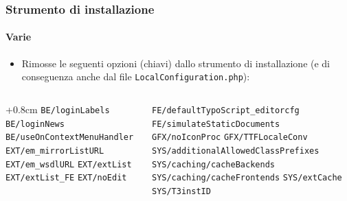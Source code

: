 
\begin{frame}[fragile]
	\frametitle{Strumento di installazione}
	\framesubtitle{Varie}

	\begin{itemize}
		\item Rimosse le seguenti opzioni (chiavi) dallo strumento di installazione\newline
			(e di conseguenza anche dal file \texttt{LocalConfiguration.php}):
	\end{itemize}

	\begin{columns}[T]
		\begin{column}{.5\textwidth}
			\advance\leftskip+0.8cm
			\smaller
				\texttt{BE/loginLabels}\newline
				\texttt{BE/loginNews}\newline
				\texttt{BE/useOnContextMenuHandler}\newline
				\texttt{EXT/em\_mirrorListURL}\newline
				\texttt{EXT/em\_wsdlURL}\newline
				\texttt{EXT/extList}\newline
				\texttt{EXT/extList\_FE}\newline
				\texttt{EXT/noEdit}\newline
			\normalsize
		\end{column}
		\begin{column}{.5\textwidth}
			\smaller
				\texttt{FE/defaultTypoScript\_editorcfg}\newline
				\texttt{FE/simulateStaticDocuments}\newline
				\texttt{GFX/noIconProc}\newline
				\texttt{GFX/TTFLocaleConv}\newline
				\texttt{SYS/additionalAllowedClassPrefixes}\newline
				\texttt{SYS/caching/cacheBackends}\newline
				\texttt{SYS/caching/cacheFrontends}\newline
				\texttt{SYS/extCache}\newline
				\texttt{SYS/T3instID}\newline
			\normalsize
		\end{column}

	\end{columns}

\end{frame}


